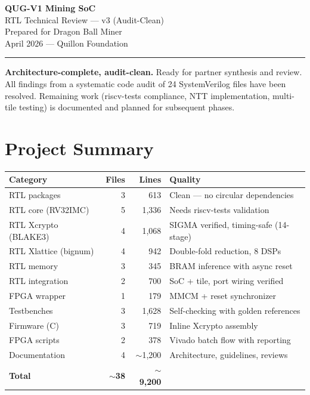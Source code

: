 \documentclass[11pt,a4paper]{article}
\begin{document}
\begin{center}
{\Huge\bfseries\color{qnkpurple} QUG-V1 Mining SoC}\\[6pt]
{\LARGE\color{qnkslate} RTL Technical Review --- v3 (Audit-Clean)}\\[12pt]
{\large\color{qnkslate} Prepared for Dragon Ball Miner}\\[4pt]
{\normalsize\color{qnkslate} April 2026 --- Quillon Foundation}\\[4pt]
\textcolor{qnkpurple}{\rule{0.6\textwidth}{2pt}}
\end{center}

\vspace{0.5em}

\begin{keyinsight}[Status]
\textbf{Architecture-complete, audit-clean.} Ready for partner synthesis and review. All findings from a systematic code audit of 24 SystemVerilog files have been resolved. Remaining work (riscv-tests compliance, NTT implementation, multi-tile testing) is documented and planned for subsequent phases.
\end{keyinsight}

\section{Project Summary}

\begin{center}
\begin{tabular}{@{}lrrp{6.5cm}@{}}
\toprule
\textbf{Category} & \textbf{Files} & \textbf{Lines} & \textbf{Quality} \\
\midrule
RTL packages & 3 & 613 & Clean --- no circular dependencies \\
RTL core (RV32IMC) & 5 & 1,336 & Needs riscv-tests validation \\
RTL Xcrypto (BLAKE3) & 4 & 1,068 & SIGMA verified, timing-safe (14-stage) \\
RTL Xlattice (bignum) & 4 & 942 & Double-fold reduction, 8 DSPs \\
RTL memory & 3 & 345 & BRAM inference with async reset \\
RTL integration & 2 & 700 & SoC + tile, port wiring verified \\
FPGA wrapper & 1 & 179 & MMCM + reset synchronizer \\
Testbenches & 3 & 1,628 & Self-checking with golden references \\
Firmware (C) & 3 & 719 & Inline Xcrypto assembly \\
FPGA scripts & 2 & 378 & Vivado batch flow with reporting \\
Documentation & 4 & $\sim$1,200 & Architecture, guidelines, reviews \\
\midrule
\textbf{Total} & \textbf{$\sim$38} & \textbf{$\sim$9,200} & \\
\bottomrule
\end{tabular}
\end{center}
\end{document}
